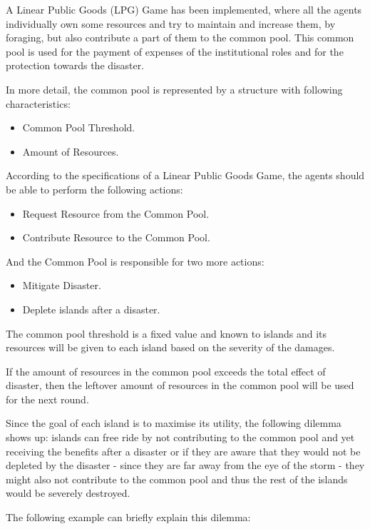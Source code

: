 A Linear Public Goods (LPG) Game has been implemented, where all the agents individually own some resources and try to maintain and increase them, by foraging, but also contribute a part of them to the common pool. This common pool is used for the payment of expenses of the institutional roles and for the protection towards the disaster.

In more detail, the common pool is represented by a structure with following characteristics:

\begin{itemize}
    \item Common Pool Threshold.
    \item Amount of Resources.
\end{itemize}

According to the specifications of a Linear Public Goods Game, the agents should be able to perform the following actions:  

\begin{itemize}
    \item Request Resource from the Common Pool.
    \item Contribute Resource to the Common Pool. 
\end{itemize}

And the Common Pool is responsible for two more actions: 

\begin{itemize}
    \item Mitigate Disaster.
    \item Deplete islands after a disaster.
\end{itemize}

The common pool threshold is a fixed value and known to islands and its resources will be given to each island based on the severity of the damages.

If the amount of resources in the common pool exceeds the total effect of disaster, then the leftover amount of resources in the common pool will be used for the next round.

Since the goal of each island is to maximise its utility, the following dilemma shows up: islands can free ride by not contributing to the common pool and yet receiving the benefits after a disaster or if they are aware that they would not be depleted by the disaster - since they are far away from the eye of the storm - they might also not contribute to the common pool and thus the rest of the islands would be severely destroyed.

The following example can briefly explain this dilemma:

